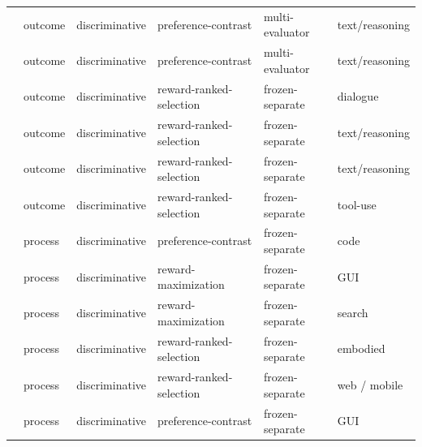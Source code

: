 \begin{table}[htbp]
{\begin{tabular}{@{}llllll@{}}
\cite{Wu25x}   & outcome & discriminative              & preference-contrast                                  & multi-evaluator  & text/reasoning      \\
\cite{Fis24}   & outcome & discriminative              & preference-contrast                                  & multi-evaluator  & text/reasoning      \\
\cite{Don23}   & outcome & discriminative              & reward-ranked-selection                              & frozen-separate  & dialogue            \\
\cite{Ses24}   & outcome & discriminative              & reward-ranked-selection                              & frozen-separate  & text/reasoning      \\
\cite{Gui24}   & outcome & discriminative              & reward-ranked-selection                              & frozen-separate  & text/reasoning      \\
\cite{Gon24b}  & outcome & discriminative              & reward-ranked-selection                              & frozen-separate  & tool-use            \\
\cite{Zho25p}  & process & discriminative              & preference-contrast                                  & frozen-separate  & code                \\
\cite{Wan26s}  & process & discriminative              & reward-maximization                                  & frozen-separate  & GUI                 \\
\cite{Xu25h}   & process & discriminative              & reward-maximization                                  & frozen-separate  & search              \\
\cite{Zho24e}  & process & discriminative              & reward-ranked-selection                              & frozen-separate  & embodied            \\
\cite{Pan24b}  & process & discriminative              & reward-ranked-selection                              & frozen-separate  & web / mobile        \\
\cite{Luo25f}  & process & discriminative              & preference-contrast                                  & frozen-separate  & GUI                 \\

\end{tabular}}
\end{table}

